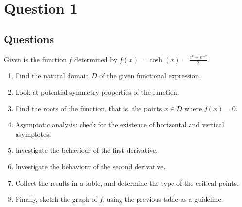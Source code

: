 \chapter{Question 1}
\section{Questions}
Given is the function $f$ determined by
$f(x) = \cosh(x) = \frac{e^x + e^{-x}}{2}$.
\begin{enumerate}
  \item Find the natural domain $D$ of the given functional expression.
  \item Look at potential symmetry properties of the function.
  \item Find the roots of the function, that is, the points $x \in D$ where
  $f(x) = 0$.
  \item Asymptotic analysis: check for the existence of horizontal and vertical
  asymptotes.
  \item Investigate the behaviour of the first derivative.
  \item Investigate the behaviour of the second derivative.
  \item Collect the results in a table, and determine the type of the critical
  points.
  \item Finally, sketch the graph of $f$, using the previous table as a
  guideline.
\end{enumerate}

